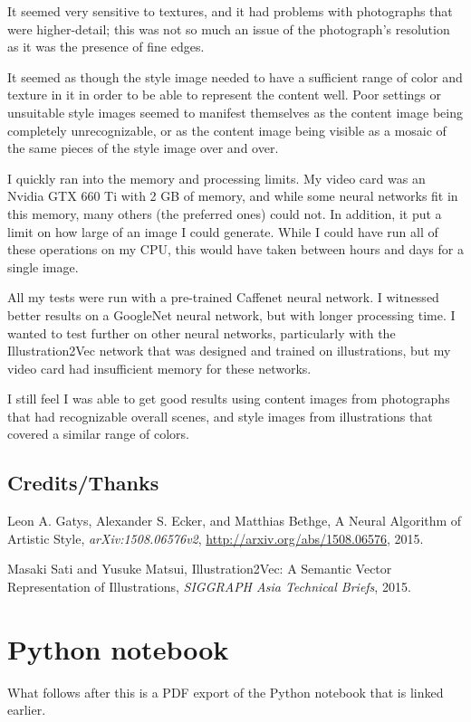 \documentclass{article}
\begin{document}
It seemed very sensitive to textures, and it had problems with
photographs that were higher-detail; this was not so much an issue of
the photograph's resolution as it was the presence of fine edges.

It seemed as though the style image needed to have a sufficient range
of color and texture in it in order to be able to represent the
content well.  Poor settings or unsuitable style images seemed to
manifest themselves as the content image being completely
unrecognizable, or as the content image being visible as a mosaic of
the same pieces of the style image over and over.

I quickly ran into the memory and processing limits.  My video card
was an Nvidia GTX 660 Ti with 2 GB of memory, and while some neural
networks fit in this memory, many others (the preferred ones) could
not.  In addition, it put a limit on how large of an image I could
generate.  While I could have run all of these operations on my CPU,
this would have taken between hours and days for a single image.

All my tests were run with a pre-trained Caffenet neural network.  I
witnessed better results on a GoogleNet neural network, but with
longer processing time.  I wanted to test further on other neural
networks, particularly with the Illustration2Vec network that was
designed and trained on illustrations\cite{Saito2015}, but my video
card had insufficient memory for these networks.

I still feel I was able to get good results using content images from
photographs that had recognizable overall scenes, and style images
from illustrations that covered a similar range of colors.

\subsection{Credits/Thanks}


\begin{thebibliography}{9}

 Leon A. Gatys, Alexander S. Ecker, and
  Matthias Bethge, A Neural Algorithm of Artistic Style,
  \emph{arXiv:1508.06576v2}, \url{http://arxiv.org/abs/1508.06576},
  2015.

Masaki Sati and Yusuke Matsui,
  Illustration2Vec: A Semantic Vector Representation of Illustrations,
  \emph{SIGGRAPH Asia Technical Briefs}, 2015.
  
\end{thebibliography}

\section{Python notebook}

What follows after this is a PDF export of the Python notebook that is
linked earlier.
\end{document}
